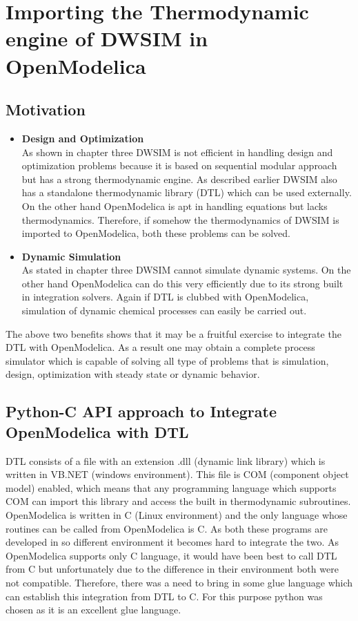 \documentclass[12pt]{report}
\begin{document}
\chapter{Importing the Thermodynamic engine of DWSIM in OpenModelica}

\section{Motivation}
\begin{itemize}
\item{\textbf{Design and Optimization}} \\
As shown in chapter three DWSIM is not efficient in handling design and optimization problems because it is based on sequential modular approach but has a strong thermodynamic engine. As described earlier DWSIM also has a standalone thermodynamic library (DTL) which can be used externally. On the other hand OpenModelica is apt in handling equations but lacks thermodynamics. Therefore, if somehow the thermodynamics of DWSIM is imported to OpenModelica, both these problems can be solved.

\item{\textbf{Dynamic Simulation}} \\
As stated in chapter three DWSIM cannot simulate dynamic systems. On the other hand OpenModelica can do this very efficiently due to its strong built in integration solvers. Again if DTL is clubbed with OpenModelica, simulation of dynamic chemical processes can easily be carried out.

\end{itemize}
The above two benefits shows that it may be a fruitful exercise to integrate the DTL with OpenModelica. As a result one may obtain a complete process simulator which is capable of solving all type of problems that is simulation, design, optimization with steady state or dynamic behavior.

\section{Python-C API approach to Integrate OpenModelica with DTL}
DTL consists of a file with an extension .dll (dynamic link library) which is written in VB.NET (windows environment). This file is COM (component object model) enabled, which means that any programming language which supports COM can import this library and access the built in thermodynamic subroutines. OpenModelica is written in C (Linux environment) and the only language whose routines can be called from OpenModelica is C. As both these programs are developed in so different environment it becomes hard to integrate the two.
As OpenModelica supports only C language, it would have been best to call DTL from C but unfortunately due to the difference in their environment both were not compatible. Therefore, there was a need to bring in some glue language which can establish this integration from DTL to C. For this purpose python was chosen as it is an excellent glue language.
\end{document}
